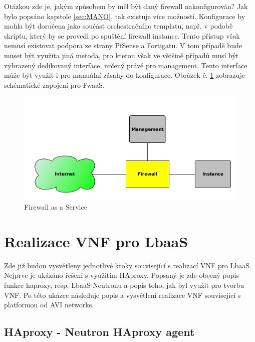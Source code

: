 Otázkou zde je, jakým způsobem by měl být daný firewall nakonfigurován? Jak bylo popsáno kapitole \ref{sec:MANO}, tak existuje více možností. Konfigurace by mohla být doručena jako součást orchestračního templatu, např. v podobě skriptu, který by se provedl po spuštění firewall instance. Tento přístup však nemusí existovat podpora ze strany PfSense a Fortigatu. V tom případě bude muset být využita jiná metoda, pro kterou však ve většině případů musí být vyhrazený dedikovaný interface, určený právě pro management. Tento interface múže být využit i pro manuální zásahy do konfigurace. Obrázek č. \ref{fig:firewall} zobrazuje schématické zapojení pro FwaaS.

\begin{figure}[h]
\begin{centering}
\includegraphics[scale=0.6]{images/firewall}
\par\end{centering}
\caption{Firewall as a Service\label{fig:firewall}}
\end{figure}


\section{Realizace VNF pro LbaaS} \label{sec:realizace_lbaas}

Zde již budou vysvětleny jednotlivé kroky související s realizací VNF pro LbaaS. Nejprve je ukázáno řešení s využitím HAproxy. Popsaný je zde obecný popis funkce haproxy, resp. LbaaS Neutronu a popis toho, jak byl využit pro tvorbu VNF. Po této ukázce následuje popis a vysvětlení realizace VNF související s platformou od AVI networks.

\subsection{HAproxy - Neutron HAproxy agent}

